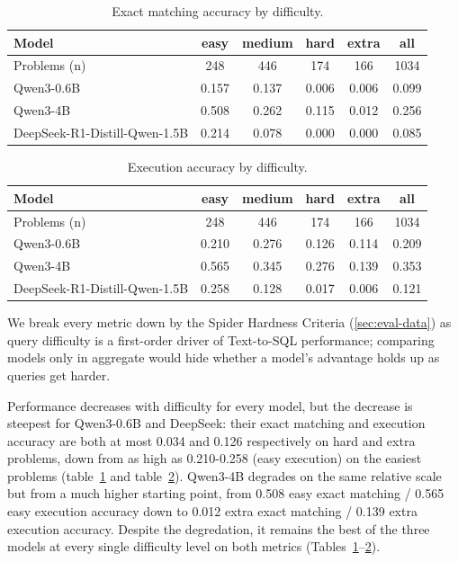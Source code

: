 \begin{table}[H]
\centering
\footnotesize
\caption{Exact matching accuracy by difficulty.}
\label{tab:difficulty-exact}
\begin{tabular}{lccccc}
\toprule
Model & easy & medium & hard & extra & all \\
\midrule
Problems (n) & 248 & 446 & 174 & 166 & 1034 \\
Qwen3-0.6B & 0.157 & 0.137 & 0.006 & 0.006 & 0.099 \\
Qwen3-4B & 0.508 & 0.262 & 0.115 & 0.012 & 0.256 \\
DeepSeek-R1-Distill-Qwen-1.5B & 0.214 & 0.078 & 0.000 & 0.000 & 0.085 \\
\bottomrule
\end{tabular}
\end{table}

\begin{table}[H]
\centering
\footnotesize
\caption{Execution accuracy by difficulty.}
\label{tab:difficulty-execution}
\begin{tabular}{lccccc}
\toprule
Model & easy & medium & hard & extra & all \\
\midrule
Problems (n) & 248 & 446 & 174 & 166 & 1034 \\
Qwen3-0.6B & 0.210 & 0.276 & 0.126 & 0.114 & 0.209 \\
Qwen3-4B & 0.565 & 0.345 & 0.276 & 0.139 & 0.353 \\
DeepSeek-R1-Distill-Qwen-1.5B & 0.258 & 0.128 & 0.017 & 0.006 & 0.121 \\
\bottomrule
\end{tabular}
\end{table}

We break every metric down by the Spider Hardness Criteria (\ref{sec:eval-data}) as query difficulty is a first-order driver of Text-to-SQL performance; comparing models only in aggregate would hide whether a model's advantage holds up as queries get harder.

Performance decreases with difficulty for every model, but the decrease is steepest for Qwen3-0.6B and DeepSeek: their exact matching and execution accuracy are both at most 0.034 and 0.126 respectively on hard and extra problems, down from as high as 0.210-0.258 (easy execution) on the easiest problems (table~\ref{tab:difficulty-exact} and table~\ref{tab:difficulty-execution}). Qwen3-4B degrades on the same relative scale but from a much higher starting point, from 0.508 easy exact matching / 0.565 easy execution accuracy down to 0.012 extra exact matching / 0.139 extra execution accuracy. Despite the degredation, it remains the best of the three models at every single difficulty level on both metrics (Tables~\ref{tab:difficulty-exact}--\ref{tab:difficulty-execution}).

